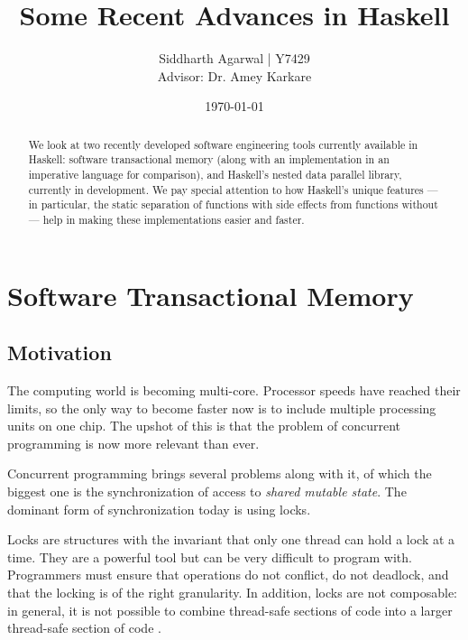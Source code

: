 \documentclass[a4paper]{acmtrans2m}
\title{Some Recent Advances in Haskell}
\author{Siddharth Agarwal | Y7429\\
  Advisor: Dr. Amey Karkare}
\date{\today}
\begin{document}
\maketitle

\tableofcontents

\begin{abstract}
We look at two recently developed software engineering tools currently available
in Haskell: software transactional memory (along with an implementation in an
imperative language for comparison), and Haskell's nested data parallel library,
currently in development. We pay special attention to how Haskell's unique
features --- in particular, the static separation of functions with side effects
from functions without --- help in making these implementations easier and
faster.
\end{abstract}

\section{Software Transactional Memory}

\subsection{Motivation}

The computing world is becoming multi-core. Processor speeds have reached their
limits, so the only way to become faster now is to include multiple processing
units on one chip. The upshot of this is that the problem of concurrent
programming is now more relevant than ever.

Concurrent programming brings several problems along with it, of which the
biggest one is the synchronization of access to \textit{shared mutable
  state}. The dominant form of synchronization today is using locks.

Locks are structures with the invariant that only one thread can hold a lock at
a time. They are a powerful tool but can be very difficult to program
with. Programmers must ensure that operations do not conflict, do not deadlock,
and that the locking is of the right granularity. In addition, locks are not
composable: in general, it is not possible to combine thread-safe sections of
code into a larger thread-safe section of code \cite{Harris:2005}.



\end{document}
